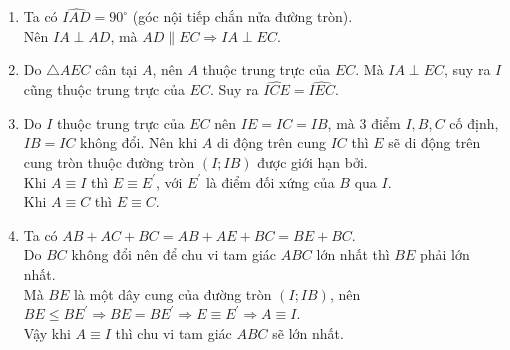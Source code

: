 \begin{bt}
{\begin{enumerate}
			Lại có $\widehat{BAC}= 2\widehat{DAC} \Rightarrow \widehat{DAC}= \widehat{ACE}$.\\
			Mà hai góc này ở vị trí so le trong nên $AD \parallel EC.$
			\item Ta có $\widehat{IAD}= 90^{\circ}$ (góc nội tiếp chắn nửa đường tròn).\\
			Nên $IA \perp AD$, mà $AD \parallel EC \Rightarrow IA \perp EC.$
			\item Do $\triangle AEC$ cân tại $A$, nên $A$ thuộc trung trực của $EC$. Mà $IA \perp EC$, suy ra $I$ cũng thuộc trung trực của $EC$. Suy ra $\widehat{ICE}= \widehat{IEC}.$
			\item Do $I$ thuộc trung trực của $EC$ nên $IE= IC= IB$, mà $3$ điểm $I, B, C$ cố định, $IB= IC$ không đổi. Nên khi $A$ di động trên cung $IC$ thì $E$ sẽ di động trên cung tròn thuộc đường tròn $(I; IB)$ được giới hạn bởi.\\
			Khi $A \equiv I$ thì $E \equiv E^{'}$, với $E^{'}$ là điểm đối xứng của $B$ qua $I$.\\
			Khi $A \equiv C$ thì $E \equiv C.$
			\item Ta có $AB+ AC+ BC= AB+ AE+ BC= BE+ BC$.\\
			Do $BC$ không đổi nên để chu vi tam giác $ABC$ lớn nhất thì $BE$ phải lớn nhất.\\
			Mà $BE$ là một dây cung của đường tròn $(I; IB)$, nên $BE \leq BE^{'} \Rightarrow BE= BE^{'} \Rightarrow E \equiv E^{'} \Rightarrow A \equiv I$.\\
			Vậy khi $A \equiv I$ thì chu vi tam giác $ABC$ sẽ lớn nhất.
		\end{enumerate}
	}
\end{bt}

